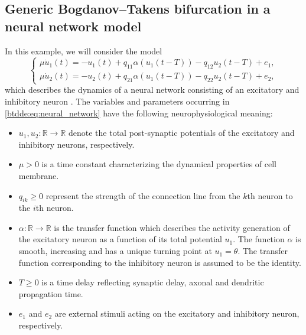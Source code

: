 \subsection{\ifthesis \phantom{ } \fi Generic Bogdanov--Takens bifurcation in a neural network model}
In this example, we will consider the model 
\begin{equation}
\label{btdde:eq:neural_network}
\begin{cases}
\mu\dot{u}_1(t) = -u_1(t) + q_{11}\alpha(u_1(t - T))-q_{12}u_2(t - T) + e_1,\\
\mu\dot{u}_2(t) = -u_2(t) + q_{21}\alpha(u_1(t - T))-q_{22}u_2(t - T) + e_2,
\end{cases}
\end{equation}
which describes the dynamics of a neural network consisting of an
excitatory and inhibitory neuron \cite{giannakopoulos2001bifurcations}.
The variables and parameters occurring in \cref{btdde:eq:neural_network}
have the following neurophysiological meaning:
\begin{itemize}
\item $u_1,u_2:\mathbb{R}\rightarrow\mathbb{R}$ denote the total post-synaptic
potentials of the excitatory and inhibitory neurons, respectively.
\item $\mu>0$ is a time constant characterizing the dynamical properties
of cell membrane.
\item $q_{ik}\geq0$ represent the strength of the connection line from
the $k$th neuron to the $i$th neuron.
\item $\alpha:\mathbb{R}\rightarrow\mathbb{R}$ is the transfer function
which describes the activity generation of the excitatory neuron as
a function of its total potential $u_1$. The function $\alpha$
is smooth, increasing and has a unique turning point at $u_1 = \theta$.
The transfer function corresponding to the inhibitory neuron is assumed
to be the identity.
\item $T\geq0$ is a time delay reflecting synaptic delay, axonal and dendritic
propagation time.
\item $e_1$ and $e_2$ are external stimuli acting on the excitatory
and inhibitory neuron, respectively.
\end{itemize}

